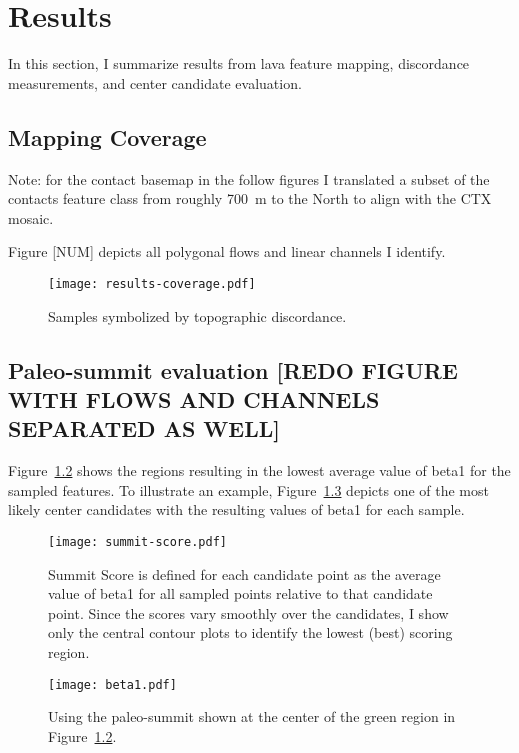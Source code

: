 \chapter{Results}

In this section, I summarize results from lava feature mapping, discordance measurements, and center candidate evaluation. 

\section{Mapping Coverage}

Note: for the contact basemap in the follow figures I translated a subset of the contacts feature class from \textcite{mouginis-mark_geologic_2021} roughly \qty{700}{\m} to the North to align with the \ac{CTX} mosaic.

Figure [NUM] depicts all polygonal flows and linear channels I identify.



\begin{figure}
    \texttt{[image: results-coverage.pdf]}%
    \caption[Mapped topographic discordance]{Samples symbolized by topographic discordance.}%
    \label{fig:results-coverage}
\end{figure}

\section{Paleo-summit evaluation [REDO FIGURE WITH FLOWS AND CHANNELS SEPARATED AS WELL]}

Figure~\ref{fig:summit-score} shows the regions resulting in the lowest average value of \acs{beta1} for the sampled features. To illustrate an example, Figure~\ref{fig:beta1} depicts one of the most likely center candidates with the resulting values of \acs{beta1} for each sample.

\begin{figure}
    \texttt{[image: summit-score.pdf]}%
    \caption[Paleo-summit evaluation]{Summit Score is defined for each candidate point as the average value of \acs{beta1} for all sampled points relative to that candidate point. Since the scores vary smoothly over the candidates, I show only the central contour plots to identify the lowest (best) scoring region.}%
    \label{fig:summit-score}
\end{figure}


\begin{figure}
    \texttt{[image: beta1.pdf]}%
    \caption[Distribution of \acs{beta1} for one paleo-summit candidate]{Using the paleo-summit shown at the center of the green region in Figure~\ref{fig:summit-score}.}%
    \label{fig:beta1}
\end{figure}

